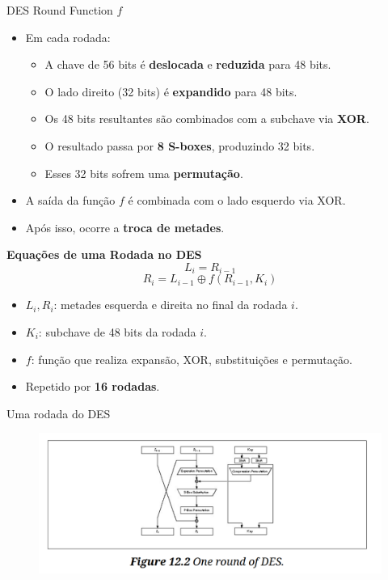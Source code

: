 \begin{frame}{DES Round Function $f$}
    \begin{itemize}
        \item Em cada rodada:
        \begin{itemize}
            \item A chave de 56 bits é \textbf{deslocada} e \textbf{reduzida} para 48 bits.
            \item O lado direito (32 bits) é \textbf{expandido} para 48 bits.
            \item Os 48 bits resultantes são combinados com a subchave via \textbf{XOR}.
            \item O resultado passa por \textbf{8 S-boxes}, produzindo 32 bits.
            \item Esses 32 bits sofrem uma \textbf{permutação}.
        \end{itemize}
        \item A saída da função $f$ é combinada com o lado esquerdo via XOR.
        \item Após isso, ocorre a \textbf{troca de metades}.
    \end{itemize}
\textbf{Equações de uma Rodada no DES}
    \[
        L_i = R_{i-1}
    \]
    \[
        R_i = L_{i-1} \oplus f(R_{i-1}, K_i)
    \]
    \begin{itemize}
        \item $L_i, R_i$: metades esquerda e direita no final da rodada $i$.
        \item $K_i$: subchave de 48 bits da rodada $i$.
        \item $f$: função que realiza expansão, XOR, substituições e permutação.
        \item Repetido por \textbf{16 rodadas}.
    \end{itemize}
\end{frame}

\begin{frame}{ Uma rodada do DES}
\begin{figure}
    \centering
    \includegraphics[width=\linewidth]{Figuras/one-round-des.png}

\end{figure}
    
\end{frame}

